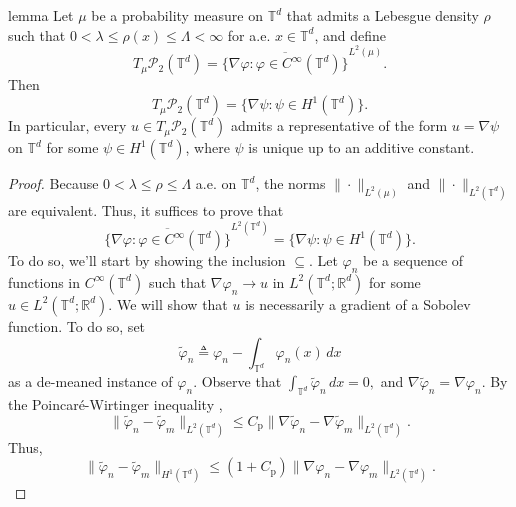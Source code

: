 \documentclass[11pt]{article}
\begin{document}
\begin{restatable}{lemma}{} \label{tangent space realization}
    Let $\mu$ be a probability measure on $\mathbb{T}^d$ that admits a Lebesgue density $\rho$ such that $0 < \lambda \leq \rho(x) \leq \Lambda < \infty$ for a.e. $x \in \mathbb{T}^d$, and define 
    \[T_\mu\mathcal P_2(\mathbb T^d)
    =
    \overline{\{\nabla\varphi:\varphi\in C^\infty(\mathbb T^d)\}}^{L^2(\mu)}.\]
    Then 
    \[T_\mu\mathcal{P}_2(\mathbb{T}^d) = \{\nabla \psi: \psi \in H^1(\mathbb{T}^d)\}.\]
    In particular, every $u \in T_\mu\mathcal{P}_2(\mathbb{T}^d)$ admits a representative of the form $u = \nabla \psi$ on $\mathbb{T}^d$ for some $\psi \in H^1(\mathbb{T}^d)$, where $\psi$ is unique up to an additive constant.  
\end{restatable}
\begin{proof}
    Because $0 < \lambda \leq \rho \leq \Lambda$ a.e. on $\mathbb{T}^d$, the norms $\|\cdot \|_{L^2(\mu)}$ and $\|\cdot\|_{L^2(\mathbb{T}^d)}$ are equivalent. Thus, it suffices to prove that 
    \[\overline{\{\nabla\varphi: \varphi \in C^\infty(\mathbb{T}^d)\}}^{L^2(\mathbb{T}^d)} = \{\nabla \psi : \psi \in H^1(\mathbb{T}^d)\}.\]
    To do so, we'll start by showing the inclusion $\subseteq$. Let $\varphi_n$ be a sequence of functions in $C^\infty(\mathbb{T}^d)$ such that $\nabla \varphi_n \rightarrow u$ in $L^2(\mathbb{T}^d; \mathbb{R}^d)$ for some $u \in L^2(\mathbb{T}^d; \mathbb{R}^d)$. We will show that $u$ is necessarily a gradient of a Sobolev function. To do so, set 
    \[\tilde \varphi_n \triangleq \varphi_n - \int_{\mathbb{T}^d}\varphi_n(x)\, dx\]
    as a de-meaned instance of $\varphi_n$. Observe that $\int_{\mathbb{T}^d}\tilde \varphi_n \,dx = 0,$ and $\nabla \tilde \varphi_n = \nabla \varphi_n$. By the Poincar\'e-Wirtinger inequality \citep{cioranescu1999introduction},
    \[\|\tilde \varphi_n - \tilde \varphi_m\|_{L^2(\mathbb{T}^d)} \leq C_{\text{p}}\|\nabla \tilde \varphi_n - \nabla \tilde \varphi_m\|_{L^2(\mathbb{T}^d)}.\]
    Thus,
    \[\|\tilde \varphi_n - \tilde \varphi_m\|_{H^1(\mathbb{T}^d)} \leq (1 + C_{\text{p}})\|\nabla \varphi_n - \nabla \varphi_m\|_{L^2(\mathbb{T}^d)}.\]

\end{proof}
\end{document}
